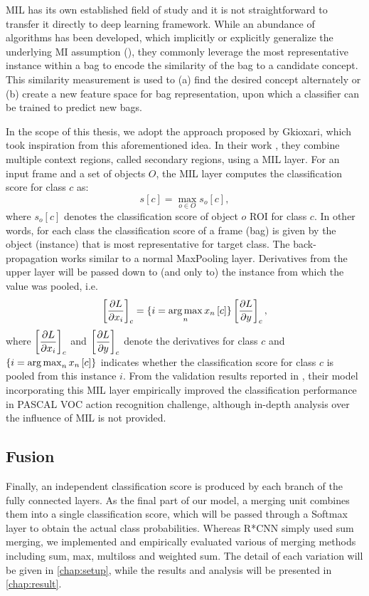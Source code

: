 MIL has its own established field of study and it is not straightforward to transfer it directly to deep learning framework. 
While an abundance of algorithms has been developed, which implicitly or explicitly generalize the underlying MI assumption (\cite{foulds2010review}), they commonly leverage the most representative instance within a bag to encode the similarity of the bag to a candidate concept.
This similarity measurement is used to (a) find the desired concept alternately or (b) create a new feature space for bag representation, upon which a classifier can be trained to predict new bags.

In the scope of this thesis, we adopt the approach proposed by Gkioxari, which took inspiration from this aforementioned idea. 
In their work \cite{gkioxari2015contextual}, they combine multiple context regions, called secondary regions, using a MIL layer. For an input frame and a set of objects $ O $, the MIL layer computes the classification score for class $ c $ as:
\begin{equation}
s\left[c\right] = \max_{o\in O} s_{o}\left[c\right],
\end{equation}
where $  s_{o}\left[c\right] $ denotes the classification score of object $ o $ ROI for class $ c $. In other words, for each class the classification score of a frame (bag) is given by the object (instance) that is most representative for target class.
The back-propagation works similar to a normal MaxPooling layer. Derivatives from the upper layer will be passed down to (and only to) the instance from which the value was pooled, i.e.
\begin{equation}
\left[\dfrac{\partial L}{\partial x_{i}}\right]_{c} = 
\lbrace i = \operatorname*{arg\,max}_{n} x_{n}\left[c\right]\rbrace\left[\dfrac{\partial L}{\partial y}\right]_{c},
\end{equation}
where $ \left[\dfrac{\partial L}{\partial x_{i}}\right]_{c}  $ and $ \left[\dfrac{\partial L}{\partial y}\right]_{c} $ denote the derivatives for class $ c $ and $ \lbrace i = \operatorname*{arg\,max}_{n} x_{n}\left[c\right]\rbrace $ indicates whether the classification score for class $ c $ is pooled from this instance $ i $.
From the validation results reported in \cite{gkioxari2015contextual}, their model incorporating this MIL layer empirically improved the classification performance in PASCAL VOC action recognition challenge, although in-depth analysis over the influence of MIL is not provided.

\subsection{Fusion}
Finally, an independent classification score is produced by each branch of the fully connected layers. 
As the final part of our model, a merging unit combines them into a single classification score, which will be passed through a Softmax layer to obtain the actual class probabilities. 
Whereas R*CNN simply used sum merging, we implemented and empirically evaluated various of merging methods including sum, max, multiloss and weighted sum.
The detail of each variation will be given in \autoref{chap:setup}, while the results and analysis will be presented in \autoref{chap:result}.


